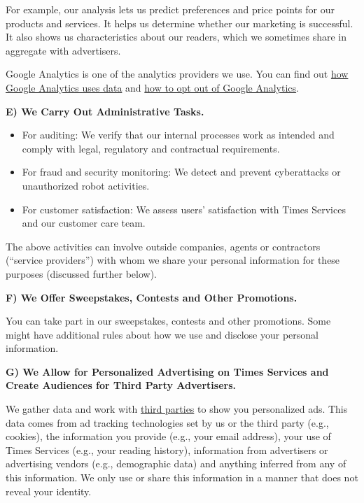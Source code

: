 For example, our analysis lets us predict preferences and price points
for our products and services. It helps us determine whether our
marketing is successful. It also shows us characteristics about our
readers, which we sometimes share in aggregate with advertisers.

Google Analytics is one of the analytics providers we use. You can find
out \href{https://policies.google.com/technologies/partner-sites}{how
Google Analytics uses data} and
\href{https://tools.google.com/dlpage/gaoptout}{how to opt out of Google
Analytics}.

\textbf{E) We Carry Out Administrative Tasks.}

\begin{itemize}
\tightlist
\item
  For auditing: We verify that our internal processes work as intended
  and comply with legal, regulatory and contractual requirements.
\item
  For fraud and security monitoring: We detect and prevent cyberattacks
  or unauthorized robot activities.
\item
  For customer satisfaction: We assess users' satisfaction with Times
  Services and our customer care team.
\end{itemize}

The above activities can involve outside companies, agents or
contractors (``service providers'') with whom we share your personal
information for these purposes (discussed further below).

\textbf{F) We Offer Sweepstakes, Contests and Other Promotions.}

You can take part in our sweepstakes, contests and other promotions.
Some might have additional rules about how we use and disclose your
personal information.

\textbf{G) We Allow for Personalized Advertising on Times Services and
Create Audiences for Third Party Advertisers.}

We gather data and work with \href{/privacy/third-party}{third parties}
to show you personalized ads. This data comes from ad tracking
technologies set by us or the third party (e.g., cookies), the
information you provide (e.g., your email address), your use of Times
Services (e.g., your reading history), information from advertisers or
advertising vendors (e.g., demographic data) and anything inferred from
any of this information. We only use or share this information in a
manner that does not reveal your identity.

